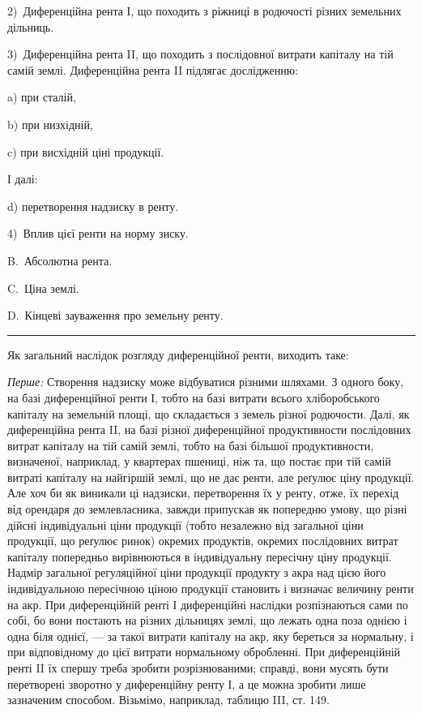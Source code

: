 \parcont{}  %
2)~Диференційна рента І, що походить з ріжниці в родючості різних земельних
дільниць.

3)~Диференційна рента II, що походить з послідовної витрати капіталу
на тій самій землі. Диференційна рента II підлягає дослідженню:

a) при сталій,

b) при низхідній,

c) при висхідній ціні продукції.

І далі:

d) перетворення надзиску в ренту.

4)~Вплив цієї ренти на норму зиску.

B.~Абсолютна рента.

C.~Ціна землі.

D.~Кінцеві зауваження про земельну ренту.

\pfbreak

Як загальний наслідок розгляду диференційної ренти, виходить таке:

\emph{Перше:} Створення надзиску може відбуватися різними шляхами. З одного
боку, на базі диференційної ренти І, тобто на базі витрати всього
хліборобського капіталу на земельній площі, що складається з земель різної
родючости. Далі, як диференційна рента II, на базі різної диференційної продуктивности
послідовних витрат капіталу на тій самій землі, тобто на базі
більшої продуктивности, визначеної, наприклад, у квартерах пшениці, ніж та,
що постає при тій самій витраті капіталу на найгіршій землі, що не дає ренти,
але реґулює ціну продукції. Але хоч би як виникали ці надзиски, перетворення
їх у ренту, отже, їх перехід від орендаря до землевласника, завжди припускав
як попередню умову, що різні дійсні індивідуальні ціни продукції (тобто незалежно
від загальної ціни продукції, що реґулює ринок) окремих продуктів, окремих
послідовних витрат капіталу попередньо вирівнюються в індивідуальну
пересічну ціну продукції. Надмір загальної регуляційної ціни продукції продукту
з акра над цією його індивідуальною пересічною ціною продукції становить
і визначає величину ренти на акр. При диференційній ренті І диференційні
наслідки розпізнаються сами по собі, бо вони постають на різних дільницях
землі, що лежать одна поза однією і одна біля однієї, — за такої витрати капіталу
на акр, яку береться за нормальну, і при відповідному до цієї витрати
нормальному обробленні. При диференційній ренті II їх спершу треба зробити
розрізнюваними; справді, вони мусять бути перетворені зворотно у диференційну
ренту І, а це можна зробити лише зазначеним способом. Візьмімо, наприклад,
таблицю III, ст. 149.

